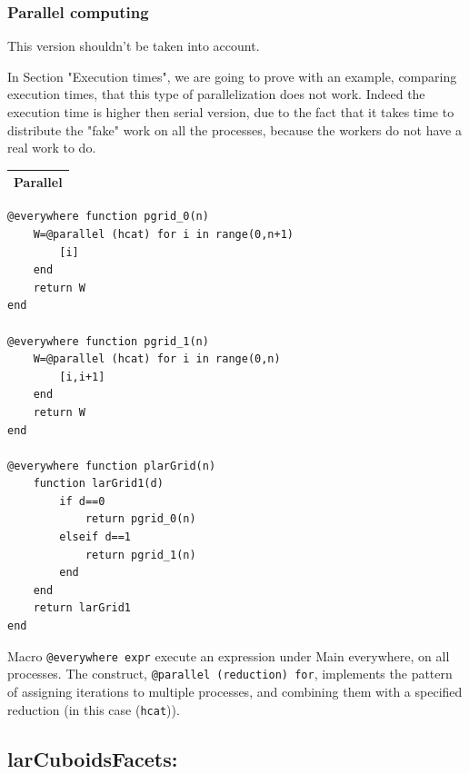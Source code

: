 \documentclass{article}
\begin{document}
\subsubsection{Parallel computing}
\vspace{1ex}
This version shouldn't be taken into account.

In Section "Execution times", we are going to prove with an example, comparing execution times, that this type of parallelization does not work. Indeed the execution time is higher then serial version, due to the fact that it takes time to distribute the "fake" work on all the processes, because the workers do not have a real work to do.
\begin{flushleft} \small
\begin{center}
\begin{tabular}{|p{16cm}|}
\hline
\cellcolor[gray]{.9}Parallel\\
\hline
\end{tabular}
\end{center}
\vspace{2ex}
\begin{list}{}{} \item
\begin{Verbatim}[tabsize=4]
@everywhere function pgrid_0(n)
	W=@parallel (hcat) for i in range(0,n+1) 
		[i] 
	end
	return W
end

@everywhere function pgrid_1(n)
	W=@parallel (hcat) for i in range(0,n) 
		[i,i+1] 
	end
	return W
end

@everywhere function plarGrid(n)
    function larGrid1(d)
        if d==0 
            return pgrid_0(n)
        elseif d==1 
            return pgrid_1(n) 
        end
    end
    return larGrid1
end
\end{Verbatim}
\end{list}
\vspace{2ex}
\footnotesize\addtolength{\baselineskip}{-1ex}
\end{flushleft}
Macro \texttt{@everywhere expr} execute an expression under Main everywhere, on all processes. The construct, \texttt{@parallel (reduction) for}, implements the pattern of assigning iterations to multiple processes, and combining them with a specified reduction (in this case (\texttt{hcat})). 
\vspace{2ex}

\newpage
\subsection{larCuboidsFacets:}
\end{document}
